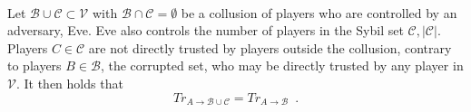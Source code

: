 \documentclass[11pt]{llncs}
\begin{document}
    \begin{theorem} \ \\
       \label{sybil}
       Let $\mathcal{B} \cup \mathcal{C} \subset \mathcal{V}$ with $\mathcal{B} \cap \mathcal{C} = \emptyset$ be a collusion
       of players who are controlled by an adversary, Eve. Eve also controls the number of players in the Sybil set
       $\mathcal{C}, |\mathcal{C}|$. Players $C \in \mathcal{C}$ are not directly trusted by players outside the collusion,
       contrary to players $B \in \mathcal{B}$, the corrupted set, who may be directly trusted by any player in
       $\mathcal{V}$. It then holds that
       \begin{equation}
          Tr_{A \rightarrow \mathcal{B} \cup \mathcal{C}} = Tr_{A \rightarrow \mathcal{B}} \enspace.
       \end{equation}
    \end{theorem}
\end{document}
